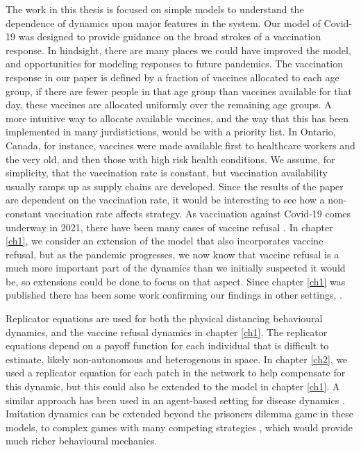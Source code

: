 The work in this thesis is focused on simple models to understand the dependence of dynamics upon major features in the system. Our model of Covid-19 was designed to provide guidance on the broad strokes of a vaccination response. In hindsight, there are many places we could have improved the model, and opportunities for modeling responses to future pandemics. The vaccination response in our paper is defined by a fraction of vaccines allocated to each age group, if there are fewer people in that age group than vaccines available for that day, these vaccines are allocated uniformly over the remaining age groups. A more intuitive way to allocate available vaccines, and the way that this has been implemented in many jurdistictions, would be with a priority list. In Ontario, Canada, for instance, vaccines were made available first to healthcare workers and the very old, and then those with high risk health conditions.  We assume, for simplicity, that the vaccination rate is constant, but vaccination availability usually ramps up as supply chains are developed. Since the results of the paper are dependent on the vaccination rate, it would be interesting to see how a non-constant vaccination rate affects strategy. As vaccination against Covid-19 comes underway in 2021, there have been many cases of vaccine refusal \cite{schwarzinger2021covid,soares2021factors,callaghan2020correlates}. In chapter \ref{ch1}, we consider an extension of the model that also incorporates vaccine refusal, but as the pandemic progresses, we now know that vaccine refusal is a much more important part of the dynamics than we initially suspected it would be, so extensions could be done to focus on that aspect. Since chapter \ref{ch1} was published there has been some work confirming our findings in other settings, \cite{chen2021age,hogan2021within}.

Replicator equations are used for both the physical distancing behavioural dynamics, and the vaccine refusal dynamics in chapter \ref{ch1}. The replicator equations depend on a payoff function for each individual that is difficult to estimate, likely non-autonomous and heterogenous in space. In chapter \ref{ch2}, we used a replicator equation for each patch in the network to help compensate for this dynamic, but this could also be extended to the model in chapter \ref{ch1}. A similar approach has been used in an agent-based setting for disease dynamics \cite{fair2021population}. Imitation dynamics can be extended beyond the prisoners dilemma game in these models, to complex games with many competing strategies \cite{hofbauer1998evolutionary}, which would provide much richer behavioural mechanics.

